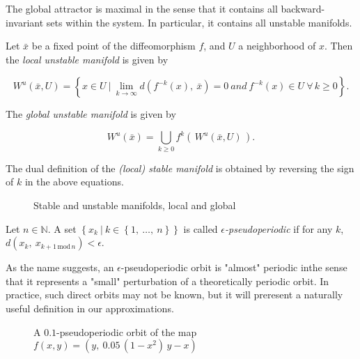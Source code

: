 The global attractor is maximal in the sense that it contains all backward-invariant 
sets within the system. In particular, it contains all unstable manifolds.

\begin{definition}
    \cite*{dynbook} Let $\bar{x}$ be a fixed point of the diffeomorphism $f$, and $U$ a neighborhood of $x$. 
    Then the \emph{local unstable manifold} is given by

    \begin{equation}
        W^u(\bar{x}, U) = \left\{x \in U\ \vert\ \lim\limits_{k \to \infty} 
        d(f^{-k}(x),\ \bar{x}) = 0\ and \ f^{-k}(x) \in U\ \forall\, k \geq 0\right\}.
    \end{equation}

    The \emph{global unstable manifold} is given by

    \begin{equation}
        W^u(\bar{x}) = \bigcup\limits_{k \geq 0} f^k(\,W^u(\bar{x}, U)\,).
    \end{equation}

    The dual definition of the \emph{(local) stable manifold} is obtained by reversing the 
    sign of $k$ in the above equations.
\end{definition}

\begin{figure}[ht]
    \caption{\cite*{dynskript} Stable and unstable manifolds, local and global}
    \label{fig:manifold}    
\end{figure}

\begin{definition}[Pseudoperiodic]
    \cite*{dynbook} Let $n\in \mathbb{N}$. A set 
    $\left\{ x_k\ \vert\ k \in \left\{ 1,\ \dotsc ,\ n \right\} \right\}$ 
    is called \emph{$\epsilon$-pseudoperiodic} if for any $k$,
    $d(x_k,\ x_{k + 1\, \text{mod}\, n}) < \epsilon$.
\end{definition}

As the name suggests, an $\epsilon$-pseudoperiodic orbit is "almost" periodic inthe sense 
that it represents a "small" perturbation of a theoretically periodic orbit. In practice,
such direct orbits may not be known, but it will preresent a naturally useful definition
in our approximations.

\begin{figure}[ht]
    \caption{\cite*{dynbook} A $0.1$-pseudoperiodic orbit of the map $f(x,y) = (y,\ 0.05\, (1 - x^2)\, y - x)$}
    \label{fig:pseudoperiodic}
\end{figure}

